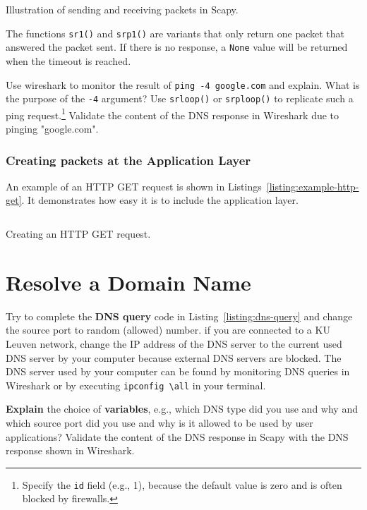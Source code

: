 \documentclass[11pt,a4paper]{article}
\begin{document}
\begin{listing}[h]
\inputminted{python}{../code_students/example_sr.py}
\caption{Illustration of sending and receiving packets in Scapy.}%
\label{listing:example-sr}
\end{listing}

 The functions \texttt{sr1()}  and \texttt{srp1()} are variants that only return one packet that answered the packet sent. If there is no response, a \texttt{None} value will be returned when the timeout is reached. 
 
 \begin{question}
     Use wireshark to monitor the result of \texttt{ping -4 google.com} and explain. What is the purpose of the \texttt{-4} argument? 
     Use \texttt{srloop()} or \texttt{srploop()} to replicate such a ping request.\footnote{Specify the \texttt{id} field (e.g., 1), because the default value is zero and is often blocked by firewalls. } Validate the content of the DNS response in Wireshark due to pinging "google.com".
 \end{question}
 
\subsubsection{Creating packets at the Application Layer}
An example of an HTTP GET request is shown in Listings~\ref{listing:example-http-get}. It demonstrates how easy it is to include the application layer. 

\begin{listing}[h]
\inputminted{python}{../code_students/example-http-get.py}
\caption{Creating an HTTP GET request.}%
\label{listing:example-http-get}
\end{listing}



\FloatBarrier
\section{Resolve a Domain Name}
Try to complete the \textbf{DNS query} code in Listing~\ref{listing:dns-query} and change the source port to random (allowed) number.
if you are connected to a KU Leuven network, change the IP address of the DNS server to the current used DNS server by your computer because external DNS servers are blocked. The DNS server used by your computer can be found by monitoring DNS queries in Wireshark or by executing \texttt{ipconfig \textbackslash all} in your terminal.

\begin{question}
    \textbf{Explain} the choice of \textbf{variables}, e.g., which DNS type did you use and why and which source port did you use and why is it allowed to be used by user applications?
    Validate the content of the DNS response in Scapy with the DNS response shown in Wireshark.
\end{question}
\end{document}
